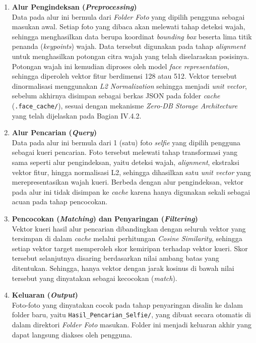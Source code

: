 \begin{enumerate}
  \item \textbf{Alur Pengindeksan (\textit{Preprocessing})} \\
  Data pada alur ini bermula dari \textit{Folder Foto} yang dipilih pengguna
  sebagai masukan awal. Setiap foto yang dibaca akan melewati tahap deteksi
  wajah, sehingga menghasilkan data berupa koordinat \textit{bounding box}
  beserta lima titik penanda (\textit{keypoints}) wajah. Data tersebut
  digunakan pada tahap \textit{alignment} untuk menghasilkan potongan citra
  wajah yang telah diselaraskan posisinya. Potongan wajah ini kemudian
  diproses oleh model \textit{face representation}, sehingga diperoleh
  vektor fitur berdimensi 128 atau 512. Vektor tersebut dinormalisasi menggunakan
  \textit{L2 Normalization} sehingga menjadi \textit{unit vector}, sebelum
  akhirnya disimpan sebagai berkas JSON pada folder \textit{cache}
  (\texttt{.face\_cache/}), sesuai dengan mekanisme \textit{Zero-DB Storage
  Architecture} yang telah dijelaskan pada Bagian IV.4.2.

  \item \textbf{Alur Pencarian (\textit{Query})} \\
  Data pada alur ini bermula dari 1 (satu) foto \textit{selfie} yang dipilih
  pengguna sebagai kueri pencarian. Foto tersebut melewati tahap transformasi
  yang sama seperti alur pengindeksan, yaitu deteksi wajah, \textit{alignment},
  ekstraksi vektor fitur, hingga normalisasi L2, sehingga dihasilkan satu
  \textit{unit vector} yang merepresentasikan wajah kueri. Berbeda dengan alur
  pengindeksan, vektor pada alur ini tidak disimpan ke \textit{cache} karena
  hanya digunakan sekali sebagai acuan pada tahap pencocokan.

  \item \textbf{Pencocokan (\textit{Matching}) dan Penyaringan
  (\textit{Filtering})} \\
  Vektor kueri hasil alur pencarian dibandingkan dengan seluruh vektor yang
  tersimpan di dalam \textit{cache} melalui perhitungan \textit{Cosine
  Similarity}, sehingga setiap vektor target memperoleh skor kemiripan
  terhadap vektor kueri. Skor tersebut selanjutnya disaring berdasarkan nilai
  ambang batas yang ditentukan. Sehingga, hanya vektor dengan jarak kosinus di bawah
  nilai tersebut yang dinyatakan sebagai kecocokan (\textit{match}).

  \item \textbf{Keluaran (\textit{Output})} \\
  Foto-foto yang dinyatakan cocok pada tahap penyaringan disalin ke dalam
  folder baru, yaitu \texttt{Hasil\_Pencarian\_Selfie/}, yang dibuat secara
  otomatis di dalam direktori \textit{Folder Foto} masukan. Folder ini
  menjadi keluaran akhir yang dapat langsung diakses oleh pengguna.
\end{enumerate}


